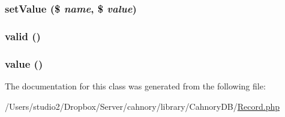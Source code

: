 \hypertarget{class_cahnory_d_b___record_8e7aaacf604710d7f853f3261d84b9fc}{
\subsubsection[{setValue}]{\setlength{\rightskip}{0pt plus 5cm}setValue (\$ {\em name}, \/  \$ {\em value})}}
\label{class_cahnory_d_b___record_8e7aaacf604710d7f853f3261d84b9fc}


\hypertarget{class_cahnory_d_b___record_bb9f0d6adf1eb9b3b55712056861a247}{
\subsubsection[{valid}]{\setlength{\rightskip}{0pt plus 5cm}valid ()}}
\label{class_cahnory_d_b___record_bb9f0d6adf1eb9b3b55712056861a247}


\hypertarget{class_cahnory_d_b___record_efbfa229f1c9e1fc967bff724a010f9e}{
\subsubsection[{value}]{\setlength{\rightskip}{0pt plus 5cm}value ()}}
\label{class_cahnory_d_b___record_efbfa229f1c9e1fc967bff724a010f9e}




The documentation for this class was generated from the following file:\begin{CompactItemize}
\item 
/Users/studio2/Dropbox/Server/cahnory/library/CahnoryDB/\hyperlink{_record_8php}{Record.php}\end{CompactItemize}
